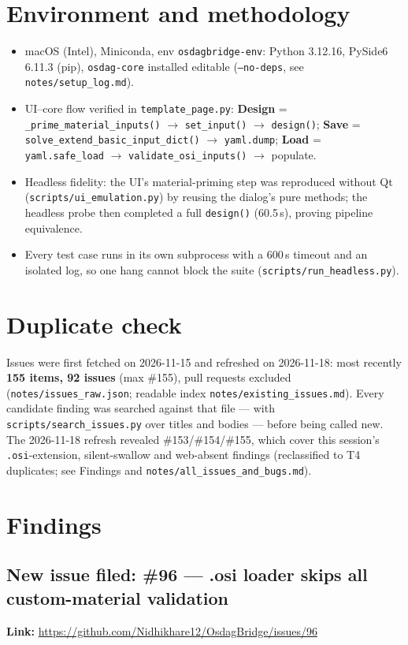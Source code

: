 \documentclass[11pt,a4paper]{article}
\begin{document}
\section{Environment and methodology}
\begin{itemize}[nosep]
  \item macOS (Intel), Miniconda, env \texttt{osdagbridge-env}: Python 3.12.16, PySide6 6.11.3 (pip), \texttt{osdag-core} installed editable (\texttt{--no-deps}, see \texttt{notes/setup\_log.md}).
  \item UI--core flow verified in \texttt{template\_page.py}: \textbf{Design} = \texttt{\_prime\_material\_inputs()} $\rightarrow$ \texttt{set\_input()} $\rightarrow$ \texttt{design()}; \textbf{Save} = \texttt{solve\_extend\_basic\_input\_dict()} $\rightarrow$ \texttt{yaml.dump}; \textbf{Load} = \texttt{yaml.safe\_load} $\rightarrow$ \texttt{validate\_osi\_inputs()} $\rightarrow$ populate.
  \item Headless fidelity: the UI's material-priming step was reproduced without Qt (\texttt{scripts/ui\_emulation.py}) by reusing the dialog's pure methods; the headless probe then completed a full \texttt{design()} (60.5\,s), proving pipeline equivalence.
  \item Every test case runs in its own subprocess with a 600\,s timeout and an isolated log, so one hang cannot block the suite (\texttt{scripts/run\_headless.py}).
\end{itemize}

\section{Duplicate check}
Issues were first fetched on 2026-11-15 and refreshed on 2026-11-18: most recently \textbf{155 items, 92 issues} (max \#155), pull requests excluded (\texttt{notes/issues\_raw.json}; readable index \texttt{notes/existing\_issues.md}). Every candidate finding was searched against that file --- with \texttt{scripts/search\_issues.py} over titles and bodies --- before being called new. The 2026-11-18 refresh revealed \#153/\#154/\#155, which cover this session's \texttt{.osi}-extension, silent-swallow and web-absent findings (reclassified to T4 duplicates; see Findings and \texttt{notes/all\_issues\_and\_bugs.md}).

\section{Findings}
\subsection{New issue filed: \#96 --- .osi loader skips all custom-material validation}
\textbf{Link:} \url{https://github.com/Nidhikhare12/OsdagBridge/issues/96}
\end{document}

